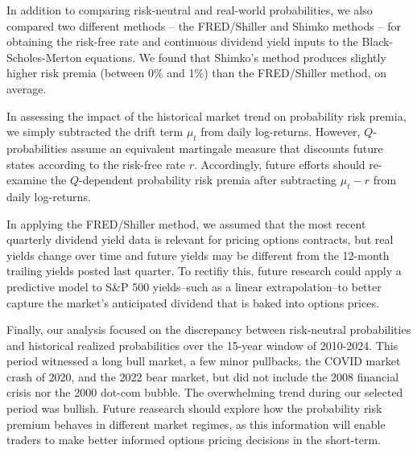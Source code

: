 \documentclass[final,3p,times,authoryear]{elsarticle}
\begin{document}
  In addition to comparing risk-neutral and real-world probabilities, we also compared two different methods -- the FRED/Shiller and Shimko methods -- for obtaining the risk-free rate and continuous dividend yield inputs to the Black-Scholes-Merton equations. We found that Shimko's method produces slightly higher risk premia (between 0\% and 1\%) than the FRED/Shiller method, on average.

  In assessing the impact of the historical market trend on probability risk premia, we simply subtracted the drift term $\mu_t$ from daily log-returns. However, $Q$-probabilities assume an equivalent martingale measure that discounts future states according to the risk-free rate $r$. Accordingly, future efforts should re-examine the $Q$-dependent probability risk premia after subtracting $\mu_t-r$ from daily log-returns.
  
  In applying the FRED/Shiller method, we assumed that the most recent quarterly dividend yield data is relevant for pricing options contracts, but real yields change over time and future yields may be different from the 12-month trailing yields posted last quarter. To rectifiy this, future research could apply a predictive model to S\&P 500 yields--such as a linear extrapolation--to better capture the market's anticipated dividend that is baked into options prices.
  
  Finally, our analysis focused on the discrepancy between risk-neutral probabilities and historical realized probabilities over the 15-year window of 2010-2024. This period witnessed a long bull market, a few minor pullbacks, the COVID market crash of 2020, and the 2022 bear market, but did not include the 2008 financial crisis nor the 2000 dot-com bubble. The overwhelming trend during our selected period was bullish. Future reasearch should explore how the probability risk premium behaves in different market regimes, as this information will enable traders to make better informed options pricing decisions in the short-term.

 

\end{document}
